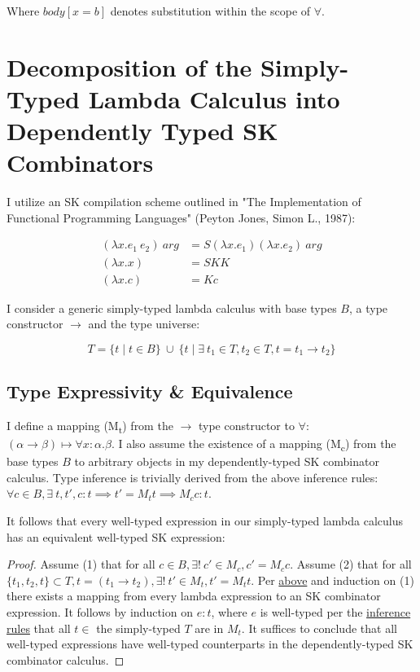 \documentclass[11pt]{article}
\begin{document}
Where \(body[x = b]\) denotes substitution within the scope of \(\forall\).

\label{decomplemma:1}
\section{Decomposition of the Simply-Typed Lambda Calculus into Dependently Typed SK Combinators}
\label{sec:org976b83f}

I utilize an SK compilation scheme outlined in "The Implementation of Functional Programming Languages" (Peyton Jones, Simon L., 1987):

\begin{align}
(\lambda x.e_{1}\ e_{2})\ arg &= S (\lambda x.e_{1}) (\lambda x.e_{2})\ arg \\
(\lambda x.x) &= SKK \\
(\lambda x.c) &= K c
\end{align}

I consider a generic simply-typed lambda calculus with base types \(B\), a type constructor \(\rightarrow\) and the type universe:

\[
T = \{ t \mid t \in B\}\ \cup\ \{ t \mid \exists\  t_{1} \in T, t_{2} \in T, t = t_{1} \rightarrow t_{2} \}
\]

\label{maplemma:1}
\subsection{Type Expressivity \& Equivalence}
\label{sec:org8f23eab}

I define a mapping (M\textsubscript{t}) from the \(\rightarrow\) type constructor to \(\forall\): \((\alpha \rightarrow \beta) \mapsto \forall x : \alpha.\beta\). I also assume the existence of a mapping (M\textsubscript{c}) from the base types \(B\) to arbitrary objects in my dependently-typed SK combinator calculus. Type inference is trivially derived from the above inference rules: \(\forall c \in B, \exists\ t, t', c : t \implies t' = M_{t} t \implies M_{c} c : t\).

It follows that every well-typed expression in our simply-typed lambda calculus has an equivalent well-typed SK expression:

\begin{proof}
Assume (1) that for all $c \in B, \exists!\ c' \in M_{c}, c' = M_{c} c$.
Assume (2) that for all $\{t_{1}, t_{2}, t\} \subset T, t = (t_{1} \rightarrow t_{2}), \exists!\ t' \in M_{t}, t' = M_{t} t$.
Per \href{decomplemma:1}{above} and induction on (1) there exists a mapping from every lambda expression to an SK combinator expression.
It follows by induction on $e : t$, where $e$ is well-typed per the \href{decomplemma:1}{inference rules} that all $t \in$ the simply-typed $T$ are in $M_{t}$.
It suffices to conclude that all well-typed expressions have well-typed counterparts in the dependently-typed SK combinator calculus.
\end{proof}
\end{document}
